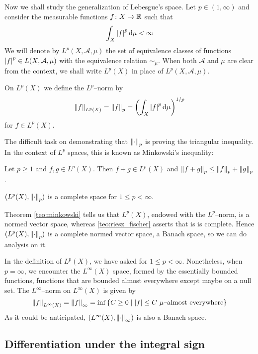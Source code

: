 Now we shall study the generalization of Lebesgue's space. Let $p \in (1,\infty)$
and consider the measurable functions $f \colon X \rightarrow \mathbb{R}$ such that
\[
	\int_X \abs{f}^p \dd{\mu} < \infty	
\]
We will denote by $L^p(X, \mathcal{A}, \mu)$ the set of equivalence classes of
functions $\abs{f}^p \in L(X, \mathcal{A}, \mu)$ with the equivalence relation
$\sim_\mu$. When both $\mathcal{A}$ and $\mu$ are clear from the context, we
shall write $L^p(X)$ in place of $L^p(X, \mathcal{A}, \mu)$.

\begin{definition*}
	On $L^p(X)$ we define the $L^p$--norm by
	\[
		\norm{f}_{L^p(X)} = \norm{f}_p = \left( \int_X \abs{f}^p \dd{\mu} \right)^{1/p}	
	\]
	for $f \in L^p(X)$.
\end{definition*}

The difficult task on demonstrating that $\norm{\cdot}_p$ is proving the
triangular inequality. In the context of $L^p$ spaces, this is known as Minkowski's inequality:

\begin{theorem} \label{teo:minkowski}
	Let $p \geq 1$ and $f, g \in L^p(X)$. Then $f + g \in L^p(X)$ and $\norm{f +
	g}_p \leq \norm{f}_p + \norm{g}_p$.
\end{theorem}

\begin{theorem} \label{teo:riesz_fischer}
	$(L^p(X), \norm{\cdot}_p)$ is a complete space for $1 \leq p < \infty$.
\end{theorem}

Theorem \ref{teo:minkowski} tells us that $L^p(X)$, endowed with the
$L^p$--norm, is a normed vector space, whereas \ref{teo:riesz_fischer} asserts
that is is complete. Hence $(L^p(X), \norm{\cdot}_p)$ is a complete normed
vector space, \ie a Banach space, so we can do analysis on it.

In the definition of $L^p(X)$, we have asked for $1 \leq p < \infty$.
Nonetheless, when $p = \infty$, we encounter the $L^\infty(X)$ space, formed by
the essentially bounded functions, \ie functions that are bounded almost
everywhere except maybe on a null set. The $L^\infty$--norm on $L^\infty(X)$ is given by
\[
	\norm{f}_{L^\infty(X)} = 
	\norm{f}_\infty = 
	\inf{\{ C \geq 0 \mid \abs{f} \leq C \ \mu\text{--almost everywhere} \}}
\]
As it could be anticipated, $(L^\infty(X), \norm{\cdot}_\infty)$ is also a Banach space.

\clearpage
\subsection{Differentiation under the integral sign}

